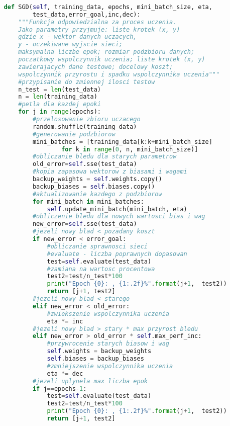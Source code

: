 \documentclass[12pt,twoside]{article}
\begin{document}
\begin{lstlisting}[language=Python,caption=Algorytm uczenia sieci,label={Kod2}]
    
    def SGD(self, training_data, epochs, mini_batch_size, eta,
            test_data,error_goal,inc,dec):
        """Funkcja odpowiedzialna za proces uczenia.
        Jako parametry przyjmuje: liste krotek (x, y)
        gdzie x - wektor danych uczacych, 
        y - oczekiwane wyjscie sieci;
        maksymalna liczbe epok; rozmiar podzbioru danych;
        poczatkowy wspolczynnik uczenia; liste krotek (x, y)
        zawierajacych dane testowe; docelowy koszt;
        wspolczynnik przyrostu i spadku wspolczynnika uczenia"""
        #przypisanie do zmiennej ilosci testow
        n_test = len(test_data)
        n = len(training_data)
        #petla dla kazdej epoki
        for j in range(epochs):
            #przelosowanie zbioru uczacego
            random.shuffle(training_data)
            #generowanie podzbiorow
            mini_batches = [training_data[k:k+mini_batch_size]
                    for k in range(0, n, mini_batch_size)]
            #obliczanie bledu dla starych parametrow
            old_error=self.sse(test_data)
            #kopia zapasowa wektorow z biasami i wagami
            backup_weights = self.weights.copy()
            backup_biases = self.biases.copy()
            #aktualizowanie kazdego z podzbiorow
            for mini_batch in mini_batches:
                self.update_mini_batch(mini_batch, eta)
            #obliczenie bledu dla nowych wartosci bias i wag
            new_error=self.sse(test_data)
            #jezeli nowy blad < pozadany koszt
            if new_error < error_goal:
                #obliczanie sprawnosci sieci
                #evaluate - liczba poprawnych dopasowan
                test=self.evaluate(test_data)
                #zamiana na wartosc procentowa
                test2=test/n_test*100
                print("Epoch {0}: , {1:.2f}%".format(j+1,  test2))             
                return [j+1, test2]
            #jezeli nowy blad < starego
            elif new_error < old_error:
                #zwiekszenie wspolczynnika uczenia 
                eta *= inc
            #jezeli nowy blad > stary * max przyrost bledu
            elif new_error > old_error * self.max_perf_inc:
                #przywrocenie starych biasow i wag
                self.weights = backup_weights
                self.biases = backup_biases
                #zmniejszenie wspolczynnika uczenia
                eta *= dec
            #jezeli uplynela max liczba epok 
            if j==epochs-1:
                test=self.evaluate(test_data)
                test2=test/n_test*100
                print("Epoch {0}: , {1:.2f}%".format(j+1,  test2))
                return [j+1, test2]


\end{lstlisting}
\end{document}
